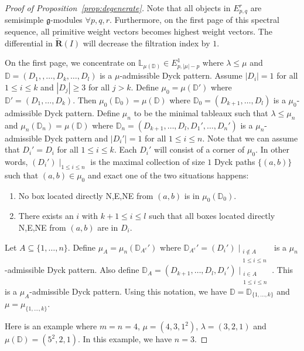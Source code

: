 \documentclass[12pt]{amsart}
\theoremstyle{definition}
\theoremstyle{remark}
\newcommand{\bbD}{\mathbb{D}}
\newcommand{\bbL}{\mathbb{L}}
\newcommand{\bR}{\mathbf{R}}
\newcommand{\fg}{\mathfrak{g}}
\numberwithin{equation}{section}
\begin{document}
\begin{proof}[Proof of Proposition~\ref{prop:degenerate}]
 Note that all objects in $E^r_{p,q}$ are semisimple $\fg$-modules $\forall p,q,r$. Furthermore, on the first page of this spectral sequence, all primitive weight vectors becomes highest weight vectors. The differential in $\tilde{\bR}(I)$ will decrease the filtration index by $1$. 
 
 On the first page, we concentrate on $\bbL_{\mu(\bbD)} \in E^1_{p,|\mu|-p}$ where $\lambda \leq \mu$ and $\bbD = (D_1,,\ldots,D_k,\ldots,D_l)$ is a $\mu$-admissible Dyck pattern. Assume $|D_i| = 1$ for all $1 \leq i \leq k$ and $|D_j| \geq 3$ for all $j > k$. Define $\mu_0 = \mu(\bbD ')$ where $\bbD ' = (D_1,\ldots,D_k)$. Then $\mu_0(\bbD_0) = \mu(\bbD)$ where $\bbD_0 = (D_{k+1},\ldots,D_{l})$ is a $\mu_0$-admissible Dyck pattern. Define $\mu_n$ to be the minimal tableaux such that $\lambda \leq \mu_n$ and $\mu_n(\bbD_n) = \mu(\bbD)$ where $\bbD_n = (D_{k+1},\ldots,D_{l},D_1 ',\ldots,D_n ')$ is a $\mu_n$-admissible Dyck pattern and $|D_i '| = 1$ for all $1 \leq i \leq n$. Note that we can assume that $D_i ' = D_i$ for all $1 \leq i \leq k$. Each $D_i '$ will consist of a corner of $\mu_0$. In other words, $(D_i ') \mid_{1 \leq i \leq n}$ is the maximal collection of size $1$ Dyck paths $\{ (a,b) \}$ such that $(a,b) \in \mu_0$ and exact one of the two situations happens: 
 \begin{enumerate}
     \item No box located directly N,E,NE from $(a,b)$ is in $\mu_0(\bbD_0)$.
     \item There exists an $i$ with $k+1 \leq i \leq l$ such that all boxes located directly N,E,NE from $(a,b)$ are in $D_i$.
 \end{enumerate}
 Let $A \subseteq \{1,\ldots,n\}$. Define $\mu_A = \mu_n(\bbD_{A^c}')$ where $\bbD_{A^c} ' = (D_i ') \mid_{\substack{i \notin A \\ 1 \leq i \leq n}}$ is a $\mu_n$-admissible Dyck pattern. Also define $\bbD_A = (D_{k+1},\ldots,D_l,D_i ') \mid_{\substack{i \in A \\ 1 \leq i \leq n}}$. This is a $\mu_A$-admissible Dyck pattern. Using this notation, we have $\bbD = \bbD_{\{1,\ldots,k\}}$ and $\mu = \mu_{\{1,\ldots,k\}}$. 
 
Here is an example where $m=n=4$, $\mu = (4,3,1^2)$, $\lambda = (3,2,1)$ and $\mu(\bbD) = (5^2,2,1)$. In this example, we have $n=3$.


\end{proof}
\end{document}
